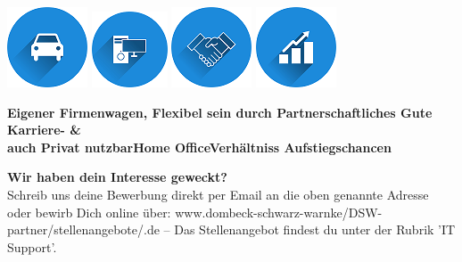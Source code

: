 \documentclass[12pt,utf8]{scrartcl}
\begin{document}
\begin{flushleft}
\begin{center}
	\includegraphics{images/auto}\label{fig:auto}\hspace{1,5cm}
	\includegraphics{images/home}\label{fig:home}\hspace{1,5cm}	
	\includegraphics{images/handshake}\label{fig:handshake}\hspace{1,5cm}		
	\includegraphics{images/statistics}\label{fig:statistics}  
\end{center}
\hspace{0,3cm}\textbf{Eigener Firmenwagen,\hspace{0,7cm} Flexibel sein durch \hspace{0,9cm}Partnerschaftliches \hspace{1,1cm}Gute Karriere- \& \\ \hspace{0,4cm}auch Privat nutzbar\hspace{1,5cm}Home Office\hspace{2,1cm}Verhältniss \hspace{2cm}Aufstiegschancen} 			

\vspace{1cm}
\textbf{Wir haben dein Interesse geweckt?}\\
Schreib uns deine Bewerbung direkt per Email an die oben genannte Adresse oder bewirb Dich online über: www.dombeck-schwarz-warnke/DSW-partner/stellenangebote/.de – Das Stellenangebot findest du unter der Rubrik 'IT Support'.

\normalsize
\newpage
{}


\end{flushleft}
\end{document}
